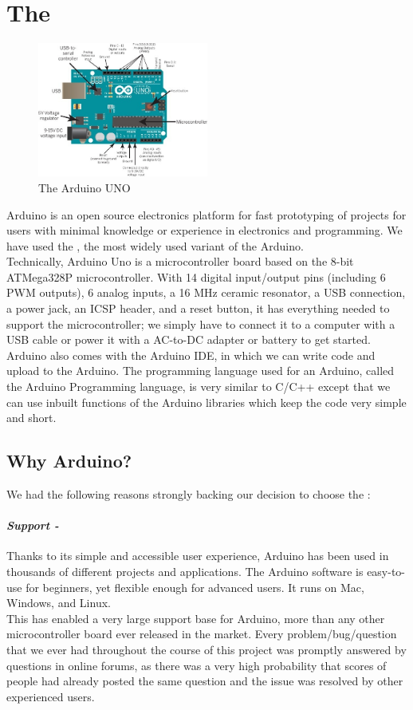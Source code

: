 \section{The \arduinouno}
\begin{figure}[H]
	\centering
	\includegraphics[width=0.5\textwidth]{../Files/arduino_parts.jpeg}
	\caption{The Arduino UNO}  \label{fig:Arduino}
\end{figure}
Arduino is an open source electronics platform for fast prototyping of projects for users with minimal knowledge or experience in electronics and programming. We have used the \arduinouno, the most widely used variant of the Arduino.\\
Technically, Arduino Uno is a microcontroller board based on the 8-bit ATMega328P microcontroller. With 14 digital
input/output pins (including 6 PWM outputs), 6 analog inputs, a 16 MHz ceramic resonator, a USB connection, a power jack, an ICSP header, and a reset button, it has everything needed to support the microcontroller; we simply have to connect it to a computer with a USB cable or power it with a AC-to-DC adapter or battery to get started.\\
Arduino also comes with the Arduino IDE, in which we can write code and upload to the Arduino. The programming language used for an Arduino, called the Arduino Programming language, is very similar to C/C++ except that we can use inbuilt functions of the Arduino libraries which keep the code very simple and short.

\subsection{Why Arduino?}
We had the following reasons strongly backing our decision to choose the \arduinouno :
\paragraph{\textit{Support -}}
 Thanks to its simple and accessible user experience, Arduino has been used in thousands of different projects and applications. The Arduino software is easy-to-use for beginners, yet flexible enough for advanced users. It runs on Mac, Windows, and Linux.\\
 This has enabled a very large support base for Arduino, more than any other microcontroller board ever released in the market. Every problem/bug/question that we ever had throughout the course of this project was promptly answered by questions in online forums, as there was a very high probability that scores of people had already posted the same question and the issue was resolved by other experienced users.
